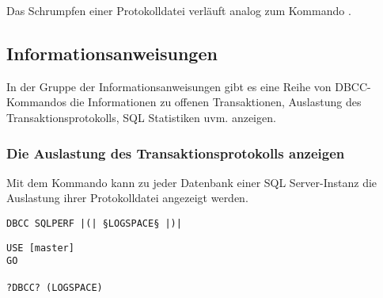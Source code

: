           Das Schrumpfen einer Protokolldatei verläuft analog zum Kommando
          .
          \begin{literaturinternet}
            \item \cite{ms190488}
            \item \cite{ms189493}
          \end{literaturinternet}
      \subsection{Informationsanweisungen}
        In der Gruppe der Informationsanweisungen gibt es eine Reihe von
        DBCC-Kommandos die Informationen zu offenen Transaktionen, Auslastung
        des Transaktionsprotokolls, SQL Statistiken uvm. anzeigen.
        \subsubsection{Die Auslastung des Transaktionsprotokolls anzeigen}
          Mit dem Kommando  kann zu jeder Datenbank einer
          SQL Server-Instanz die Auslastung ihrer Protokolldatei angezeigt
          werden.
          \begin{lstlisting}[language=ebnf, caption={Die Syntax zu
          SQLPERF}, label=admin03_37]
DBCC SQLPERF |(| §LOGSPACE§ |)|
          \end{lstlisting}
          \begin{lstlisting}[language=ms_sql,caption={Anzeigen
          der Protokolldateiauslastung},label=admin03_36]
USE [master]
GO

?DBCC? (LOGSPACE)
          \end{lstlisting}
\clearpage

